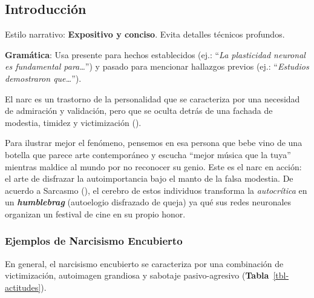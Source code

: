 \documentclass[
  10pt]{article}
\begin{document}
\newpage
{}
\subsection{Introducción}\label{sec-intro}

\begin{tcolorbox}[enhanced jigsaw, colframe=quarto-callout-tip-color-frame, opacitybacktitle=0.6, coltitle=black, colback=white, left=2mm, breakable, bottomtitle=1mm, toptitle=1mm, titlerule=0mm, toprule=.15mm, opacityback=0, rightrule=.15mm, bottomrule=.15mm, colbacktitle=quarto-callout-tip-color!10!white, arc=.35mm, leftrule=.75mm, title=\textcolor{quarto-callout-tip-color}{\faLightbulb}\hspace{0.5em}{Tip}]

Estilo narrativo: \textbf{Expositivo y conciso}. Evita detalles técnicos
profundos.

\textbf{Gramática}: Usa presente para hechos establecidos (ej.:
``\emph{La plasticidad neuronal es fundamental para\ldots{}}'') y pasado
para mencionar hallazgos previos (ej.: ``\emph{Estudios demostraron
que\ldots{}}'').

\end{tcolorbox}

El \ac{narc} es un trastorno de la personalidad que se caracteriza por
una necesidad de admiración y validación, pero que se oculta detrás de
una fachada de modestia, timidez y victimización
().

Para ilustrar mejor el fenómeno, pensemos en esa persona que bebe vino
de una botella que parece arte contemporáneo y escucha ``mejor música
que la tuya'' mientras maldice al mundo por no reconocer su genio. Este
es el \ac{narc}  en
acción: el arte de disfrazar la autoimportancia bajo el manto de la
falsa modestia. De acuerdo a Sarcasmo
(), el cerebro de estos
individuos transforma la \emph{autocrítica} en un
\textbf{\emph{humblebrag}} (autoelogio disfrazado de queja) ya qué sus
redes neuronales organizan un festival de cine en su propio honor.

\subsubsection{Ejemplos de Narcisismo
Encubierto}\label{ejemplos-de-narcisismo-encubierto}

En general, el narcisismo encubierto se caracteriza por una combinación
de victimización, autoimagen grandiosa y sabotaje pasivo-agresivo
(\textbf{Tabla}~\ref{tbl-actitudes}).
\end{document}
